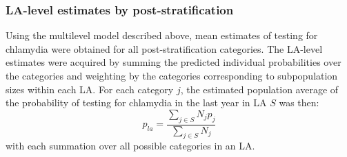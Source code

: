\documentclass[12pt]{article}
\begin{document}
\subsubsection*{LA-level estimates by post-stratification}
Using the multilevel model described above, mean estimates of testing for chlamydia were obtained for all post-stratification categories. The LA-level estimates were acquired by summing the predicted individual probabilities over the categories and weighting by the categories corresponding to subpopulation sizes within each LA.
For each category $j$, the estimated population average of the probability of testing for chlamydia in the last year in LA $S$ was then:
\begin{displaymath}
p_{la} = \frac{\sum_{j\in S} N_j p_j}{\sum_{j\in S} N_j}
\end{displaymath}
with each summation over all possible categories in an LA.


%


\end{document}
